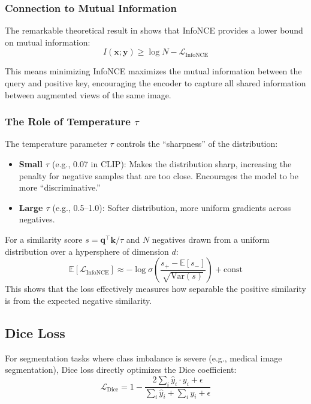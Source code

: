 \subsubsection{Connection to Mutual Information}

The remarkable theoretical result in \cite{oord2018representation} shows that InfoNCE provides a lower bound on mutual information:
\begin{equation}
I(\mathbf{x}; \mathbf{y}) \geq \log N - \mathcal{L}_{\text{InfoNCE}}
\end{equation}

This means minimizing InfoNCE maximizes the mutual information between the query and positive key, encouraging the encoder to capture all shared information between augmented views of the same image.

\subsubsection{The Role of Temperature \texorpdfstring{$\tau$}{tau}}

The temperature parameter $\tau$ controls the ``sharpness'' of the distribution:
\begin{itemize}
    \item \textbf{Small $\tau$} (e.g., 0.07 in CLIP): Makes the distribution sharp, increasing the penalty for negative samples that are too close. Encourages the model to be more ``discriminative.''
    \item \textbf{Large $\tau$} (e.g., 0.5--1.0): Softer distribution, more uniform gradients across negatives.
\end{itemize}

For a similarity score $s = \mathbf{q}^\top \mathbf{k} / \tau$ and $N$ negatives drawn from a uniform distribution over a hypersphere of dimension $d$:
\begin{equation}
\mathbb{E}[\mathcal{L}_{\text{InfoNCE}}] \approx -\log \sigma\!\left(\frac{s_{+} - \mathbb{E}[s_{-}]}{\sqrt{\text{Var}(s)}}\right) + \text{const}
\end{equation}
This shows that the loss effectively measures how separable the positive similarity is from the expected negative similarity.

\subsection{Dice Loss}

For segmentation tasks where class imbalance is severe (e.g., medical image segmentation), Dice loss \cite{milletari2016v} directly optimizes the Dice coefficient:
\begin{equation}
\mathcal{L}_{\text{Dice}} = 1 - \frac{2 \sum_{i} \hat{y}_i \cdot y_i + \epsilon}{\sum_{i} \hat{y}_i + \sum_{i} y_i + \epsilon}
\end{equation}

